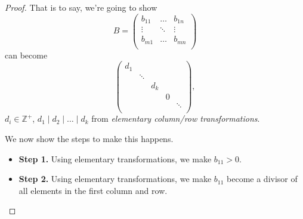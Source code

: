 \begin{proof}
	That is to say, we're going to show
	\[
		B = \begin{pmatrix}
			b_{11} & \dots  & b_{1n} \\
			\vdots & \ddots & \vdots \\
			b_{m1} & \dots  & b_{mn} \\
		\end{pmatrix}
	\]
	can become
	\[
		\begin{pmatrix}
			d_1 &        &       &   &        \\
			    & \ddots &       &   &        \\
			    &        & d_{k} &   &        \\
			    &        &       & 0 &        \\
			    &        &       &   & \ddots \\
		\end{pmatrix},
	\]
	\(d_{i} \in \mathbb{Z} ^+\), \(d_1\mid d_2 \mid \dots \mid d_k \) from \emph{elementary column/row transformations}.

	We now show the steps to make this happens.
	\begin{itemize}
		\item \textbf{Step 1.} Using elementary transformations, we make \(b_{11} >0 \).
		\item \textbf{Step 2.} Using elementary transformations, we make \(b_{11}\) become a divisor of all elements in the first column and row.


\end{itemize}
\end{proof}
